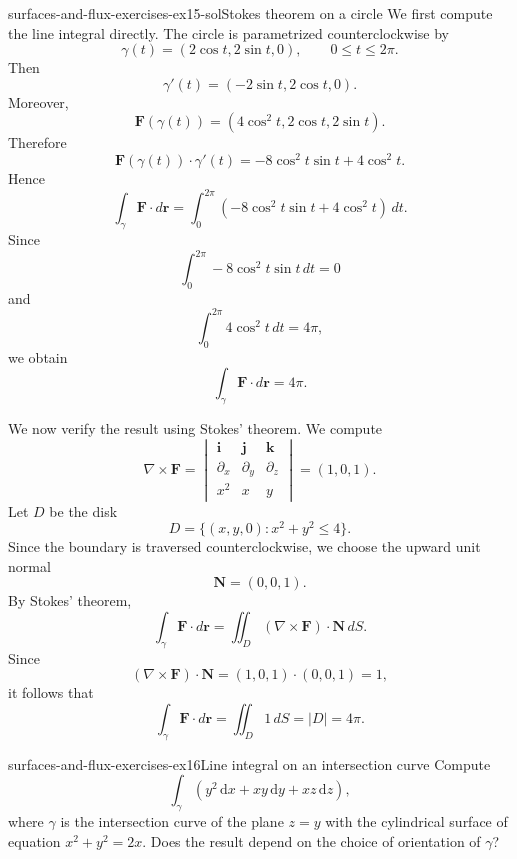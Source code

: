 \documentclass[preview]{standalone}
\begin{document}
\begin{snippetsolution}{surfaces-and-flux-exercises-ex15-sol}{Stokes theorem on a circle}
    We first compute the line integral directly. The circle is parametrized counterclockwise by
    \[
        \gamma(t)=(2\cos t,2\sin t,0),
        \qquad 0\leq t\leq 2\pi.
    \]
    Then
    \[
        \gamma'(t)=(-2\sin t,2\cos t,0).
    \]
    Moreover,
    \[
        \mathbf{F}(\gamma(t))
        =
        (4\cos^2 t,2\cos t,2\sin t).
    \]
    Therefore
    \[
        \mathbf{F}(\gamma(t))\cdot \gamma'(t)
        =
        -8\cos^2 t\sin t+4\cos^2 t.
    \]
    Hence
    \[
        \int_\gamma \mathbf{F}\cdot d\mathbf{r}
        =
        \int_0^{2\pi}
        \left(
            -8\cos^2 t\sin t+4\cos^2 t
        \right)
        \,dt.
    \]
    Since
    \[
        \int_0^{2\pi}-8\cos^2 t\sin t\,dt=0
    \]
    and
    \[
        \int_0^{2\pi}4\cos^2 t\,dt=4\pi,
    \]
    we obtain
    \[
        \int_\gamma \mathbf{F}\cdot d\mathbf{r}
        =
        4\pi.
    \]

    We now verify the result using Stokes' theorem. We compute
    \[
        \nabla\times\mathbf{F}
        =
        \begin{vmatrix}
            \mathbf{i} & \mathbf{j} & \mathbf{k} \\
            \partial_x & \partial_y & \partial_z \\
            x^2 & x & y
        \end{vmatrix}
        =
        (1,0,1).
    \]
    Let \(D\) be the disk
    \[
        D=\{(x,y,0):x^2+y^2\leq 4\}.
    \]
    Since the boundary is traversed counterclockwise, we choose the upward unit normal
    \[
        \mathbf{N}=(0,0,1).
    \]
    By Stokes' theorem,
    \[
        \int_\gamma \mathbf{F}\cdot d\mathbf{r}
        =
        \iint_D
        (\nabla\times\mathbf{F})\cdot\mathbf{N}\,dS.
    \]
    Since
    \[
        (\nabla\times\mathbf{F})\cdot\mathbf{N}
        =
        (1,0,1)\cdot(0,0,1)
        =
        1,
    \]
    it follows that
    \[
        \int_\gamma \mathbf{F}\cdot d\mathbf{r}
        =
        \iint_D 1\,dS
        =
        |D|
        =
        4\pi.
    \]
\end{snippetsolution}

\begin{snippetexercise}{surfaces-and-flux-exercises-ex16}{Line integral on an intersection curve}
    Compute \[\int_{\gamma}\left(y^2\,\mathrm{d}x+xy\,\mathrm{d}y+xz\,\mathrm{d}z\right),\] where \(\gamma\) is the intersection curve of the plane \(z=y\) with the cylindrical surface of equation \(x^2+y^2=2x\). Does the result depend on the choice of orientation of \(\gamma\)?
\end{snippetexercise}
\end{document}
